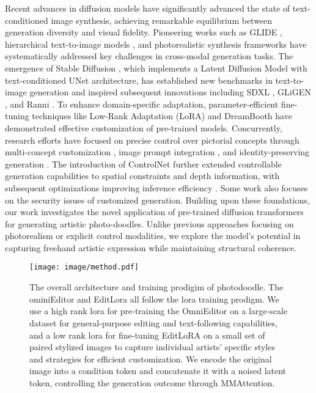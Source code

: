 Recent advances in diffusion models have significantly advanced the state of text-conditioned image synthesis, achieving remarkable equilibrium between generation diversity and visual fidelity. Pioneering works such as GLIDE \cite{nichol2021glide}, hierarchical text-to-image models \cite{ramesh2022hierarchical}, and photorealistic synthesis frameworks \cite{saharia2022photorealistic} have systematically addressed key challenges in cross-modal generation tasks. The emergence of Stable Diffusion \cite{rombach2022high}, which implements a Latent Diffusion Model with text-conditioned UNet architecture, has established new benchmarks in text-to-image generation and inspired subsequent innovations including SDXL \cite{podell2023sdxl}, GLiGEN \cite{li2023gligen}, and Ranni \cite{feng2023ranni}. To enhance domain-specific adaptation, parameter-efficient fine-tuning techniques like Low-Rank Adaptation (LoRA) \cite{lora} and DreamBooth \cite{ruiz2023dreambooth} have demonstrated effective customization of pre-trained models. Concurrently, research efforts have focused on precise control over pictorial concepts through multi-concept customization \cite{kumari2023multi}, image prompt integration \cite{ye2023ip}, and identity-preserving generation \cite{wang2024instantid}. The introduction of ControlNet \cite{zhang2023adding} further extended controllable generation capabilities to spatial constraints and depth information, with subsequent optimizations improving inference efficiency \cite{ssr, fast_icassp}. Some work \cite{antidreambooth, ringid, antirefernece,  idprotector} also focuses on the security issues of customized generation. Building upon these foundations, our work investigates the novel application of pre-trained diffusion transformers for generating artistic photo-doodles. Unlike previous approaches focusing on photorealism or explicit control modalities, we explore the model's potential in capturing freehand artistic expression while maintaining structural coherence.

\begin{figure*}[ht]
    \centering
    \texttt{[image: image/method.pdf]} %
    \caption{The overall architecture and training prodigim of photodoodle. The ominiEditor and EditLora all follow the lora training prodigm. We use a high rank lora for pre-training the OmniEditor on a large-scale dataset for general-purpose editing and text-following capabilities, and a low rank lora for fine-tuning EditLoRA on a small set of paired stylized images to capture individual artists’ specific styles and strategies for efficient customization. We encode the original image into a condition token and concatenate it with a noised latent token, controlling the generation outcome through MMAttention.}
    \label{fig2}
\end{figure*}

